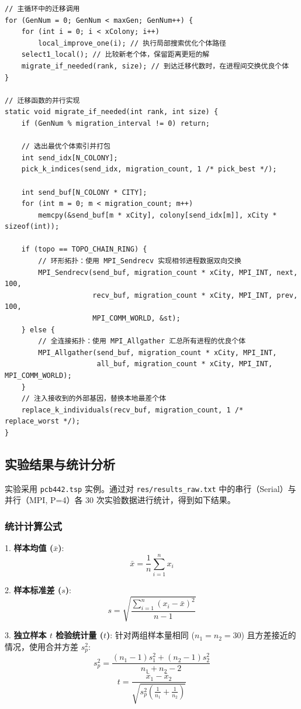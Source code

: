 \documentclass[11pt,a4paper]{article}
\begin{document}
\begin{lstlisting}[caption={并行 TSP 核心逻辑与注释 (mpitsp.c)}]
// 主循环中的迁移调用
for (GenNum = 0; GenNum < maxGen; GenNum++) {
    for (int i = 0; i < xColony; i++)
        local_improve_one(i); // 执行局部搜索优化个体路径
    select1_local(); // 比较新老个体，保留距离更短的解
    migrate_if_needed(rank, size); // 到达迁移代数时，在进程间交换优良个体
}

// 迁移函数的并行实现
static void migrate_if_needed(int rank, int size) {
    if (GenNum % migration_interval != 0) return;
    
    // 选出最优个体索引并打包
    int send_idx[N_COLONY];
    pick_k_indices(send_idx, migration_count, 1 /* pick_best */);
    
    int send_buf[N_COLONY * CITY];
    for (int m = 0; m < migration_count; m++)
        memcpy(&send_buf[m * xCity], colony[send_idx[m]], xCity * sizeof(int));

    if (topo == TOPO_CHAIN_RING) {
        // 环形拓扑：使用 MPI_Sendrecv 实现相邻进程数据双向交换
        MPI_Sendrecv(send_buf, migration_count * xCity, MPI_INT, next, 100,
                     recv_buf, migration_count * xCity, MPI_INT, prev, 100, 
                     MPI_COMM_WORLD, &st);
    } else {
        // 全连接拓扑：使用 MPI_Allgather 汇总所有进程的优良个体
        MPI_Allgather(send_buf, migration_count * xCity, MPI_INT,
                      all_buf, migration_count * xCity, MPI_INT, MPI_COMM_WORLD);
    }
    // 注入接收到的外部基因，替换本地最差个体
    replace_k_individuals(recv_buf, migration_count, 1 /* replace_worst */);
}
\end{lstlisting}

\subsection{实验结果与统计分析}
实验采用 \texttt{pcb442.tsp} 实例。通过对 \texttt{res/results\_raw.txt} 中的串行（Serial）与并行（MPI, P=4）各 30 次实验数据进行统计，得到如下结果。

\subsubsection{统计计算公式}
1. \textbf{样本均值 ($\bar{x}$)}:
$$\bar{x} = \frac{1}{n} \sum_{i=1}^{n} x_i$$

2. \textbf{样本标准差 ($s$)}:
$$s = \sqrt{\frac{\sum_{i=1}^{n} (x_i - \bar{x})^2}{n-1}}$$

3. \textbf{独立样本 $t$ 检验统计量 ($t$)}:
针对两组样本量相同 ($n_1=n_2=30$) 且方差接近的情况，使用合并方差 $s_p^2$:
$$s_p^2 = \frac{(n_1-1)s_1^2 + (n_2-1)s_2^2}{n_1+n_2-2}$$
$$t = \frac{\bar{x}_1 - \bar{x}_2}{\sqrt{s_p^2 (\frac{1}{n_1} + \frac{1}{n_2})}}$$
\end{document}
